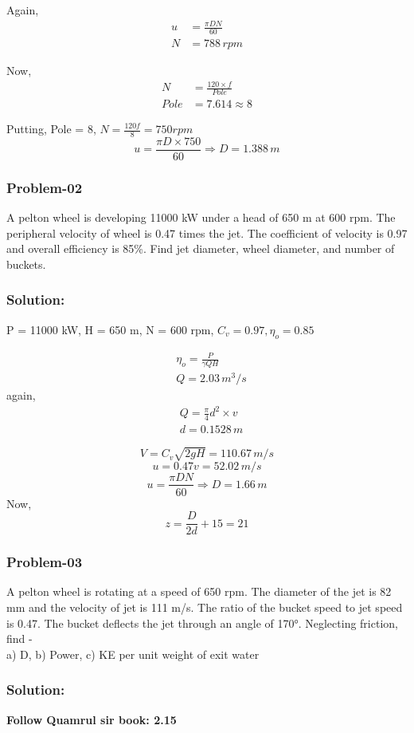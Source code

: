 \documentclass{article}
\begin{document}
\begin{multicols*}{2}
  Again, \begin{align*}
    u &= \frac{\pi D N}{60} \\
    N &= 788 \, rpm 
  \end{align*}

  Now, \begin{align*}
    N &= \frac{120 \times f}{Pole}\\
    Pole &= 7.614 \approx 8
  \end{align*}

  Putting, Pole = 8, $N = \frac{120f}{8} = 750 rpm$\\
  $$u=\frac{\pi D\times 750}{60} \Rightarrow D = 1.388 \, m$$
  \vspace*{0.5cm} 

  \subsubsection*{Problem-02}
  A pelton wheel is developing 11000 kW under a head of 650 m at 600 rpm. The peripheral velocity of wheel is 0.47 times the jet. The coefficient of velocity is 0.97 and overall efficiency is 85\%. Find jet diameter, wheel diameter, and number of buckets. 

  \subsubsection*{Solution:} 
  P = 11000 kW, H = 650 m, N = 600 rpm, $C_v = 0.97, \eta_o = 0.85$

  \begin{align*}
    &\eta_o = \frac{P}{\gamma Q H} \\
    & Q = 2.03 \, m^3/s  
  \end{align*}
  again, \begin{align*}
    &Q = \frac{\pi}{4} d^2 \times v \\
    & d = 0.1528 \, m  
  \end{align*}

  $$V = C_v \sqrt{2gH} = 110.67 \, m/s$$ 
  $$u = 0.47 v = 52.02 \, m/s$$
  $$u = \frac{\pi D N}{60} \Rightarrow D = 1.66 \, m $$
  Now, $$z = \frac{D}{2d} + 15 = 21 $$

  \vspace*{0.5cm} 
  \subsubsection*{Problem-03}
  A pelton wheel is rotating at a speed of 650 rpm. The diameter of the jet is 82 mm and the velocity of jet is 111 m/s. The ratio of the bucket speed to jet speed is 0.47. The bucket deflects the jet through an angle of 170°. Neglecting friction, find - \\
  a) D, b) Power, c) KE per unit weight of exit water 
  \subsubsection*{Solution:}
  \textbf{Follow Quamrul sir book: 2.15}
\end{multicols*} 
\end{document}
